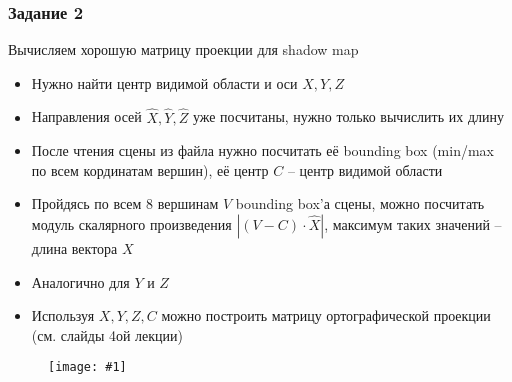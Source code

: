 \documentclass{beamer}
\newcommand{\slideimage}[1]{
  \begin{figure}
    \begin{adjustbox}{width=\textwidth, totalheight=\textheight-2\baselineskip-2\baselineskip,keepaspectratio}
      \texttt{[image: \#1]}
    \end{adjustbox}
  \end{figure}
}
\begin{document}
\begin{frame}[fragile]
\frametitle{Задание 2}
Вычисляем хорошую матрицу проекции для shadow map
\begin{itemize}
\item Нужно найти центр видимой области и оси \begin{math}X, Y, Z\end{math}
\item Направления осей \begin{math}\hat X, \hat Y, \hat Z\end{math} уже посчитаны, нужно только вычислить их длину
\item После чтения сцены из файла нужно посчитать её bounding box (min/max по всем кординатам вершин), её центр \begin{math}C\end{math} -- центр видимой области
\item Пройдясь по всем 8 вершинам \begin{math}V\end{math} bounding box'а сцены, можно посчитать модуль скалярного произведения \begin{math}|(V - C) \cdot \hat X|\end{math}, максимум таких значений -- длина вектора \begin{math}X\end{math}
\item Аналогично для \begin{math}Y\end{math} и \begin{math}Z\end{math}
\item Используя \begin{math}X,Y,Z,C\end{math} можно построить матрицу ортографической проекции (см. слайды 4ой лекции)
\end{itemize}
\end{frame}

\begin{frame}[fragile]
\slideimage{2.png}
\end{frame}
\end{document}
